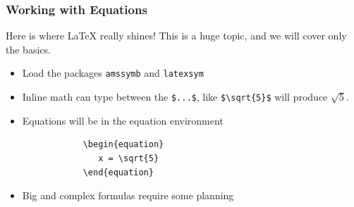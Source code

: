 \documentclass[aspectratio=169]{beamer}
\begin{document}
\begin{frame}[fragile]
\frametitle{Working with Equations}
    Here is where \LaTeX{} really shines! This is a huge topic, and we will cover only the basics.
    \begin{itemize}
        \item Load the packages \texttt{amssymb} and \texttt{latexsym}
        \item Inline math can type between the \verb|$...$|, like \verb|$\sqrt{5}$| will produce $\sqrt{5}$. 
        \item Equations will be in the equation environment
        \begin{verbatim}
            \begin{equation}
               x = \sqrt{5}
            \end{equation}
        \end{verbatim}
        \item Big and complex formulas require some planning
    \end{itemize}
\end{frame}
\end{document}
